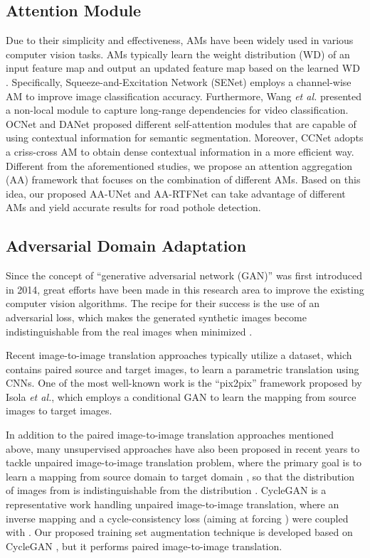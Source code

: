 \documentclass[runningheads]{llncs}
\newcommand{\etal}{\textit{et al.}}
\begin{document}
\subsection{Attention Module}
\label{sec.attention_module}
Due to their simplicity and effectiveness, AMs have been widely used in various computer vision tasks. AMs typically learn the weight distribution (WD) of an input feature map and output an updated feature map based on the learned WD \cite{vaswani2017attention}. Specifically, Squeeze-and-Excitation Network (SENet) \cite{hu2018squeeze} employs a channel-wise AM to improve image classification accuracy. Furthermore, Wang {\etal} \cite{wang2018non} presented a non-local module to capture long-range dependencies for video classification. OCNet \cite{yuan2018ocnet} and DANet \cite{fu2019dual} proposed different self-attention modules that are capable of using contextual information for semantic segmentation. Moreover, CCNet \cite{huang2019ccnet} adopts a criss-cross AM to obtain dense contextual information in a more efficient way. Different from the aforementioned studies, we propose an attention aggregation (AA) framework that focuses on the combination of different AMs. Based on this idea, our proposed AA-UNet and AA-RTFNet can take advantage of different AMs and yield accurate results for road pothole detection.

\subsection{Adversarial Domain Adaptation}
Since the concept of ``generative adversarial network (GAN)'' \cite{goodfellow2014generative} was first introduced in 2014, great efforts have been made in this research area to improve the existing computer vision algorithms. The recipe for their success is the use of an adversarial loss, {which makes the generated synthetic images become indistinguishable from the real images when minimized \cite{zhu2017unpaired}.}

Recent image-to-image translation approaches typically utilize a dataset,  which contains paired source and target images, to learn a parametric translation using CNNs. One of the most well-known work is the ``pix2pix'' framework \cite{isola2017image} proposed by Isola {\etal}, which employs a conditional GAN to learn the mapping from source images to target images.

In addition to the paired image-to-image translation approaches mentioned above, many unsupervised approaches have also been proposed  in recent years to tackle unpaired image-to-image translation problem, where the primary goal is to learn a mapping  from source domain  to target domain , so that the distribution of images from  is indistinguishable from the distribution . CycleGAN \cite{zhu2017unpaired} is a representative work handling unpaired image-to-image translation, where an inverse mapping  and a cycle-consistency loss (aiming at forcing ) were coupled with . Our proposed training set augmentation technique is developed based on CycleGAN \cite{zhu2017unpaired}, but it performs paired image-to-image translation.
\end{document}
